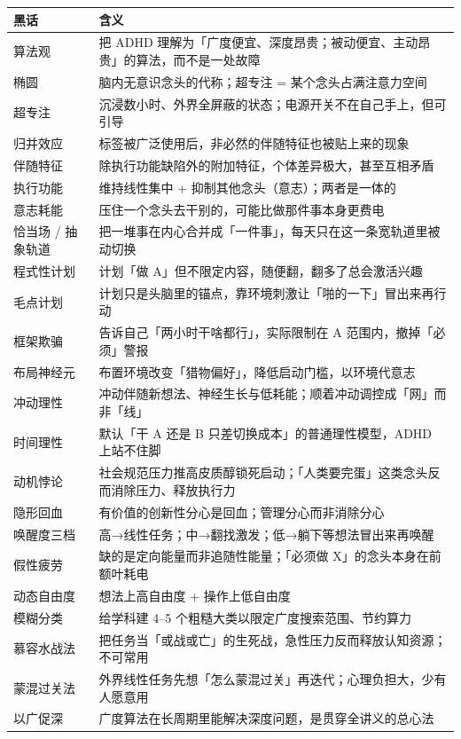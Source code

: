 \begin{center}
\small
\begin{tabular}{>{\raggedright\arraybackslash}p{3.2cm} p{12.0cm}}
\toprule
\textbf{黑话} & \textbf{含义} \\
\midrule
算法观 & 把 ADHD 理解为「广度便宜、深度昂贵；被动便宜、主动昂贵」的算法，而不是一处故障 \\
椭圆 & 脑内无意识念头的代称；超专注 = 某个念头占满注意力空间 \\
超专注 & 沉浸数小时、外界全屏蔽的状态；电源开关不在自己手上，但可引导 \\
归并效应 & 标签被广泛使用后，非必然的伴随特征也被贴上来的现象 \\
伴随特征 & 除执行功能缺陷外的附加特征，个体差异极大，甚至互相矛盾 \\
执行功能 & 维持线性集中 + 抑制其他念头（意志）；两者是一体的 \\
意志耗能 & 压住一个念头去干别的，可能比做那件事本身更费电 \\
恰当场 / 抽象轨道 & 把一堆事在内心合并成「一件事」，每天只在这一条宽轨道里被动切换 \\
程式性计划 & 计划「做 A」但不限定内容，随便翻，翻多了总会激活兴趣 \\
毛点计划 & 计划只是头脑里的锚点，靠环境刺激让「啪的一下」冒出来再行动 \\
框架欺骗 & 告诉自己「两小时干啥都行」，实际限制在 A 范围内，撤掉「必须」警报 \\
布局神经元 & 布置环境改变「猎物偏好」，降低启动门槛，以环境代意志 \\
冲动理性 & 冲动伴随新想法、神经生长与低耗能；顺着冲动调控成「网」而非「线」 \\
时间理性 & 默认「干 A 还是 B 只差切换成本」的普通理性模型，ADHD 上站不住脚 \\
动机悖论 & 社会规范压力推高皮质醇锁死启动；「人类要完蛋」这类念头反而消除压力、释放执行力 \\
隐形回血 & 有价值的创新性分心是回血；管理分心而非消除分心 \\
唤醒度三档 & 高→线性任务；中→翻找激发；低→躺下等想法冒出来再唤醒 \\
假性疲劳 & 缺的是定向能量而非追随性能量；「必须做 X」的念头本身在前额叶耗电 \\
动态自由度 & 想法上高自由度 + 操作上低自由度 \\
模糊分类 & 给学科建 4--5 个粗糙大类以限定广度搜索范围、节约算力 \\
慕容水战法 & 把任务当「或战或亡」的生死战，急性压力反而释放认知资源；不可常用 \\
蒙混过关法 & 外界线性任务先想「怎么蒙混过关」再迭代；心理负担大，少有人愿意用 \\
以广促深 & 广度算法在长周期里能解决深度问题，是贯穿全讲义的总心法 \\
\bottomrule
\end{tabular}
\end{center}

